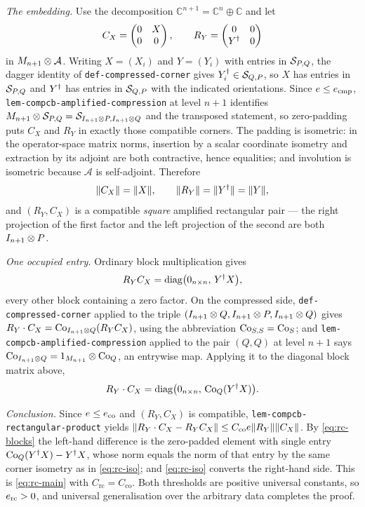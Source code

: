 \emph{The embedding.} Use the decomposition $\mathbb C^{n+1}=\mathbb C^{n}\oplus\mathbb C$
and let
\[
  C_X=\begin{pmatrix}0&X\\0&0\end{pmatrix},
  \qquad
  R_Y=\begin{pmatrix}0&0\\ Y^{\dagger}&0\end{pmatrix}
\]
in $M_{n+1}\otimes \mathcal A$. Writing $X=(X_i)$ and $Y=(Y_i)$ with entries in
$\mathcal S_{P,Q}$, the dagger identity of \texttt{def-compressed-corner} gives
$Y_i^{\dagger}\in\mathcal S_{Q,P}$, so $X$ has entries in $\mathcal S_{P,Q}$ and $Y^{\dagger}$ has entries in
$\mathcal S_{Q,P}$ with the indicated orientations. Since
$e\le e_{\mathrm{cmp}}$, \texttt{lem-compcb-amplified-compression} at level $n+1$
identifies $M_{n+1}\otimes \mathcal S_{P,Q}=\mathcal S_{I_{n+1}\otimes P,I_{n+1}\otimes Q}$ and the
transposed statement, so zero-padding puts $C_X$ and $R_Y$ in exactly those compatible
corners. The padding is isometric: in the operator-space matrix norms, insertion by a
scalar coordinate isometry and extraction by its adjoint are both contractive, hence
equalities; and involution is isometric because $\mathcal A$ is self-adjoint. Therefore
\begin{equation}\label{eq:rc-iso}
  \lVert C_X\rVert=\lVert X\rVert,\qquad \lVert R_Y\rVert=\lVert Y^{\dagger}\rVert=\lVert Y\rVert,
\end{equation}
and $(R_Y,C_X)$ is a compatible \emph{square} amplified rectangular pair --- the right
projection of the first factor and the left projection of the second are both
$I_{n+1}\otimes P$.

\emph{One occupied entry.} Ordinary block multiplication gives
\[
  R_YC_X=\operatorname{diag}\bigl(0_{n\times n},\,Y^{\dagger} X\bigr),
\]
every other block containing a zero factor. On the compressed side,
\texttt{def-compressed-corner} applied to the triple
$(I_{n+1}\otimes Q,I_{n+1}\otimes P,I_{n+1}\otimes Q)$ gives
$R_Y\mathbin{\cdot} C_X=\mathrm{Co}_{I_{n+1}\otimes Q}(R_YC_X)$, using the abbreviation $\mathrm{Co}_{S,S}=\mathrm{Co}_{S}$;
and \texttt{lem-compcb-amplified-compression} applied to the pair $(Q,Q)$ at level $n+1$
says $\mathrm{Co}_{I_{n+1}\otimes Q}=1_{M_{n+1}}\otimes\mathrm{Co}_{Q}$, an entrywise map. Applying it to the
diagonal block matrix above,
\begin{equation}\label{eq:rc-blocks}
  R_Y\mathbin{\cdot} C_X=\operatorname{diag}\bigl(0_{n\times n},\,\mathrm{Co}_{Q}(Y^{\dagger} X)\bigr).
\end{equation}

\emph{Conclusion.} Since $e\le e_{\mathrm{co}}$ and $(R_Y,C_X)$ is compatible,
\texttt{lem-compcb-rectangular-product} yields
$\lVert R_Y\mathbin{\cdot} C_X-R_YC_X\rVert\le C_{\mathrm{co}}e\lVert R_Y\rVert\lVert C_X\rVert$. By
\eqref{eq:rc-blocks} the left-hand difference is the zero-padded element with single entry
$\mathrm{Co}_{Q}(Y^{\dagger} X)-Y^{\dagger} X$, whose norm equals the norm of that entry by the same corner
isometry as in \eqref{eq:rc-iso}; and \eqref{eq:rc-iso} converts the right-hand side.
This is \eqref{eq:rc-main} with $C_{\mathrm{rc}}=C_{\mathrm{co}}$. Both thresholds are
positive universal constants, so $e_{\mathrm{rc}}>0$, and universal generalisation
over the arbitrary data completes the proof.

